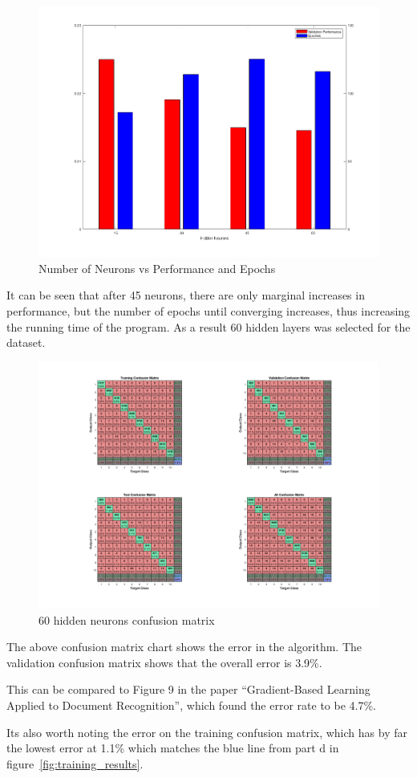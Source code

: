 \begin{figure}[H]
    \includegraphics[width=0.7\linewidth]{../../pracs/week7/images/neurons_plot}
    \centering
    \caption{Number of Neurons vs Performance and Epochs}
\end{figure}

It can be seen that after 45 neurons, there are only marginal increases in performance, but the number of epochs until converging increases, thus increasing the running time of the program.
As a result 60 hidden layers was selected for the dataset.

\begin{figure}[H]
    \includegraphics[width=\linewidth]{../../pracs/week7/images/60_hidden_neurons_confusion}
    \centering
    \caption{60 hidden neurons confusion matrix}
\end{figure}

The above confusion matrix chart shows the error in the algorithm.
The validation confusion matrix shows that the overall error is 3.9\%.

This can be compared to Figure 9 in the paper ``Gradient-Based Learning Applied to Document Recognition''\cite{lecun1998gradient}, which found the error rate to be 4.7\%. 

Its also worth noting the error on the training confusion matrix, which has by far the lowest error at 1.1\% which matches the blue line from part d in figure~\ref{fig:training_results}.





